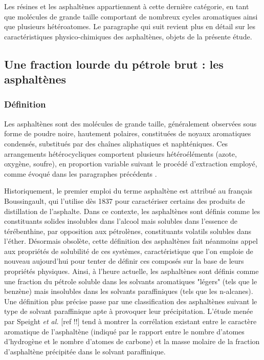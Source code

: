 Les résines et les asphaltènes appartiennent à cette dernière catégorie, en tant que molécules de grande taille comportant de nombreux cycles aromatiques ainsi que plusieurs hétéroatomes. Le paragraphe qui suit revient plus en détail sur les caractéristiques physico-chimiques des asphaltènes, objets de la présente étude. 

\subsection{Une fraction lourde du pétrole brut : les asphaltènes}


\subsubsection{Définition}

Les asphaltènes sont des molécules de grande taille, généralement observées sous forme de poudre noire, hautement polaires, constituées de noyaux aromatiques condensés, substitués par des chaînes aliphatiques et naphténiques. Ces arrangements hétérocycliques comportent plusieurs hétéroéléments (azote, oxygène, soufre), en proportion variable suivant le procédé d'extraction employé, comme évoqué dans les paragraphes précédents \cite{calles2007properties}. 

Historiquement, le premier emploi du terme \og asphaltène \fg{} est attribué au français Boussingault, qui l'utilise dès 1837 pour caractériser certains des produits de distillation de l'asphalte\cite{goual2012petroleum}. Dans ce contexte, les \og asphaltènes \fg{} sont définis comme les constituants solides insolubles dans l'alcool mais solubles dans l'essence de térébenthine, par opposition aux \og pétrolènes\fg, constituants volatils solubles dans l'éther.
Désormais obsolète, cette définition des asphaltènes fait néanmoins appel aux propriétés de solubilité de ces systèmes, caractéristique que l'on emploie de nouveau aujourd'hui pour tenter de définir ces composés sur la base de leurs propriétés physiques. Ainsi, à l'heure actuelle, les asphaltènes sont définis comme une fraction du pétrole soluble dans les solvants aromatiques "légers" (tels que le benzène) mais insolubles dans les solvants paraffiniques (tels que les n-alcanes). Une définition plus précise passe par une classification des asphaltènes suivant le type de solvant paraffinique apte à provoquer leur précipitation. L'étude menée par Speight \textit{et al.} [ref !!] tend à montrer la corrélation existant entre le caractère aromatique de l'asphaltène (indiqué par le rapport entre le nombre d'atomes d'hydrogène et le nombre d'atomes de carbone) et la masse molaire de la fraction d'asphaltène précipitée dans le solvant paraffinique.  


